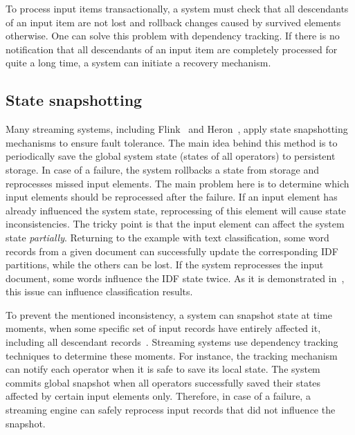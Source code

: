 To process input items transactionally, a system must check that all descendants of an input item are not lost and rollback changes caused by survived elements otherwise. One can solve this problem with dependency tracking. If there is no notification that all descendants of an input item are completely processed for quite a long time, a system can initiate a recovery mechanism.

\subsection{State snapshotting}
Many streaming systems, including Flink~\cite{Carbone:2017:SMA:3137765.3137777} and Heron~\cite{Kulkarni:2015:THS:2723372.2742788}, apply state snapshotting mechanisms to ensure fault tolerance. The main idea behind this method is to periodically save the global system state (states of all operators) to persistent storage. In case of a failure, the system rollbacks a state from storage and reprocesses missed input elements. The main problem here is to determine which input elements should be reprocessed after the failure. If an input element has already influenced the system state, reprocessing of this element will cause state inconsistencies. The tricky point is that the input element can affect the system state {\em partially}. Returning to the example with text classification, some word records from a given document can successfully update the corresponding IDF partitions, while the others can be lost. If the system reprocesses the input document, some words influence the IDF state twice. As it is demonstrated in~\cite{webirte}, this issue can influence classification results.

To prevent the mentioned inconsistency, a system can snapshot state at time moments, when some specific set of input records have entirely affected it, including all descendant records~\cite{2015arXiv150608603C, thepaper}. Streaming systems use dependency tracking techniques to determine these moments. For instance, the tracking mechanism can notify each operator when it is safe to save its local state. The system commits global snapshot when all operators successfully saved their states affected by certain input elements only. Therefore, in case of a failure, a streaming engine can safely reprocess input records that did not influence the snapshot.

